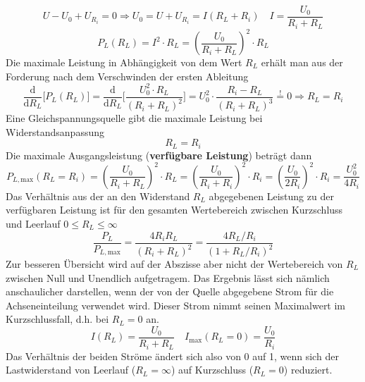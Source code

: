 \begin{equation} 
\boxed{U-U_0+U_{R_i}=0\Longrightarrow U_0=U+U_{R_i}=I\left(R_L+R_i\right)}\quad \boxed{I=\dfrac{U_0}{R_i+R_L}}
\end{equation} 
\begin{equation} 
\boxed{P_L\left(R_L\right)=I^2\cdot R_L=\left(\dfrac{U_0}{R_i+R_L}\right)^2\cdot R_L}
\end{equation} 
Die maximale Leistung in Abhängigkeit von dem Wert $R_L$ erhält man aus der Forderung nach dem Verschwinden der ersten Ableitung
\begin{equation}
\boxed{\dfrac{\text{d}}{\text{d}R_L}\Big[P_L\left(R_L\right)\Big]= \dfrac{\text{d}}{\text{d}R_L}\Big[\dfrac{U_0^2\cdot R_L}{\left(R_i+R_L\right)^2}\Big]=U_0^2\cdot \dfrac{R_i-R_L}{\left(R_i+R_L\right)^3}\stackrel{!}{=}0\Longrightarrow R_L=R_i}
\end{equation}
Eine Gleichspannungsquelle gibt die maximale Leistung bei Widerstandsanpassung
\begin{equation}
\boxed{R_L=R_i}
\end{equation}
Die maximale Ausgangsleistung (\textbf{verfügbare Leistung}) beträgt dann
\begin{equation}
\boxed{P_{L,\text{max}}\left(R_L=R_i\right)=\left(\dfrac{U_0}{R_i+R_L}\right)^2\cdot R_L=\left(\dfrac{U_0}{R_i+R_i}\right)^2\cdot R_i=\left(\dfrac{U_0}{2R_i}\right)^2\cdot R_i=\dfrac{U_0^2}{4R_i}}
\end{equation}
Das Verhältnis aus der an den Widerstand $R_L$ abgegebenen Leistung zu der verfügbaren Leistung ist für den gesamten Wertebereich zwischen Kurzschluss und Leerlauf $0\leq R_L\leq \infty$
\begin{equation}
\boxed{\dfrac{P_L}{P_{L,\text{max}}}=\dfrac{4R_iR_L}{\left(R_i+R_L\right)^2}=\dfrac{4R_L/R_i}{\left(1+R_L/R_i\right)^2}}
\end{equation}
Zur besseren Übersicht wird auf der Abszisse aber nicht der Wertebereich von $R_L$ zwischen Null und Unendlich aufgetragem. Das Ergebnis lässt sich nämlich anschaulicher darstellen, wenn der von der Quelle abgegebene Strom für die Achseneinteilung verwendet wird. Dieser Strom nimmt seinen Maximalwert im Kurzschlussfall, d.h. bei $R_L=0$ an. 
\begin{equation}
\boxed{I\left(R_L\right)=\dfrac{U_0}{R_i+R_L}}\quad \boxed{I_{\text{max}}\left(R_L=0\right)=\dfrac{U_0}{R_i}}
\end{equation}
Das Verhältnis der beiden Ströme ändert sich also von 0 auf 1, wenn sich der Lastwiderstand von Leerlauf ($R_L=\infty$) auf Kurzschluss ($R_L=0$) reduziert. 
